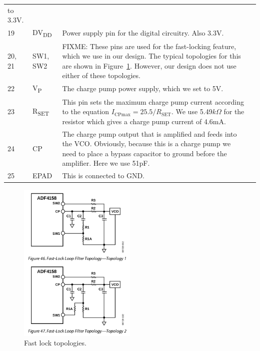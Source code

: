 \begin{tabularx}{\textwidth}{l l X>{\raggedright\arraybackslash}X}
        to 3.3V. \\
        19 & DV\textsubscript{DD} & Power supply pin for the digital circuitry. Also 3.3V. \\
        20, 21 & SW1, SW2 & FIXME: These pins are used for the fast-locking feature, which we use in our
        design. The typical topologies for this are shown in
        Figure~\ref{fig:adf4158-fast-lock}. However, our design does not use either of
        these topologies. \\
        22 & V\textsubscript{P} & The charge pump power supply, which we set to 5V. \\
        23 & R\textsubscript{SET} & This pin sets the maximum charge pump current according to the
        equation $I_{\text{CPmax}}=25.5/R_{\text{SET}}$. We use
        5.49$\si{k\Omega}$ for the resistor which gives a charge pump current
        of 4.6mA. \\
        24 & CP & The charge pump output that is amplified and feeds into the VCO. Obviously, because this
        is a charge pump we need to place a bypass capacitor to ground before the
        amplifier. Here we use 51pF. \\
        25 & EPAD & This is connected to GND. \\

        \bottomrule
\end{tabularx}

\begin{figure}[h]
        \centering
        \includegraphics[width=0.5\textwidth]{data/adf4158-fast-lock.png}
        \caption{Fast lock topologies.}
        \label{fig:adf4158-fast-lock}
\end{figure}

